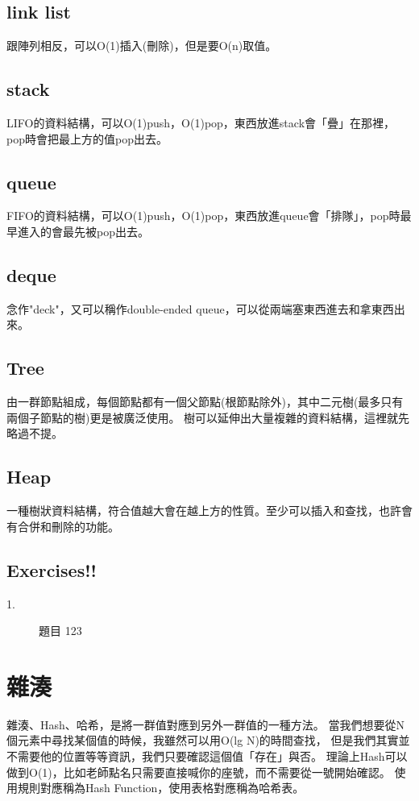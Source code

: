 \documentclass{article}
\begin{document}
\subsection{link list}
跟陣列相反，可以O(1)插入(刪除)，但是要O(n)取值。

\subsection{stack}
LIFO的資料結構，可以O(1)push，O(1)pop，東西放進stack會「疊」在那裡，pop時會把最上方的值pop出去。

\subsection{queue}
FIFO的資料結構，可以O(1)push，O(1)pop，東西放進queue會「排隊」，pop時最早進入的會最先被pop出去。

\subsection{deque}
念作"deck"，又可以稱作double-ended queue，可以從兩端塞東西進去和拿東西出來。

\subsection{Tree}
由一群節點組成，每個節點都有一個父節點(根節點除外)，其中二元樹(最多只有兩個子節點的樹)更是被廣泛使用。
樹可以延伸出大量複雜的資料結構，這裡就先略過不提。

\subsection{Heap}
一種樹狀資料結構，符合值越大會在越上方的性質。至少可以插入和查找，也許會有合併和刪除的功能。

\subsection{Exercises!!}
\begin{description}
\item[ 1.]題目
123
\end{description}


\section{雜湊}
雜湊、Hash、哈希，是將一群值對應到另外一群值的一種方法。
當我們想要從N個元素中尋找某個值的時候，我雖然可以用O(lg N)的時間查找，
但是我們其實並不需要他的位置等等資訊，我們只要確認這個值「存在」與否。
理論上Hash可以做到O(1)，比如老師點名只需要直接喊你的座號，而不需要從一號開始確認。
使用規則對應稱為Hash Function，使用表格對應稱為哈希表。
\end{document}
